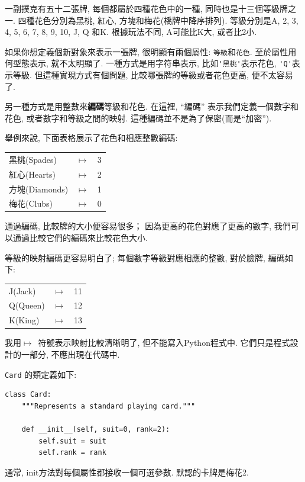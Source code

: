 \documentclass[10pt]{book}
\begin{document}
一副撲克有五十二張牌, 每個都屬於四種花色中的一種, 同時也是十三個等級牌之一. 
四種花色分別為黑桃, 紅心, 方塊和梅花(橋牌中降序排列). 
等級分別是A, 2, 3, 4, 5, 6, 7, 8, 9, 10, J, Q 和K. 根據玩法不同, 
A可能比K大, 或者比2小. 

如果你想定義個新對象來表示一張牌, 
很明顯有兩個屬性: {\tt 等級}和{\tt 花色}.
至於屬性用何型態表示, 就不太明顯了. 
一種方式是用字符串表示, 比如\verb"'黑桃'"表示花色, 
\verb"'Q'"表示等級. 
但這種實現方式有個問題, 比較哪張牌的等級或者花色更高, 便不太容易了. 

另一種方式是用整數來{\bf 編碼}等級和花色. 
在這裡, ``編碼'' 表示我們定義一個數字和花色, 或者數字和等級之間的映射. 
這種編碼並不是為了保密(而是``加密''). 

\newcommand{\mymapsto}{$\mapsto$}

舉例來說, 下面表格展示了花色和相應整數編碼:

\begin{tabular}{l c l}
黑桃(Spades) & \mymapsto & 3 \\
紅心(Hearts) & \mymapsto & 2 \\
方塊(Diamonds) & \mymapsto & 1 \\
梅花(Clubs) & \mymapsto & 0
\end{tabular}

通過編碼, 比較牌的大小便容易很多；
因為更高的花色對應了更高的數字, 我們可以通過比較它們的編碼來比較花色大小. 

等級的映射編碼更容易明白了; 
每個數字等級對應相應的整數, 對於臉牌, 編碼如下:

\begin{tabular}{l c l}
J(Jack) & \mymapsto & 11 \\
Q(Queen) & \mymapsto & 12 \\
K(King) & \mymapsto & 13 \\
\end{tabular}

我用\mymapsto~符號表示映射比較清晰明了, 但不能寫入Python程式中. 
它們只是程式設計的一部分, 不應出現在代碼中. 

{\tt Card} 的類定義如下:

\begin{verbatim}
class Card:
    """Represents a standard playing card."""

    def __init__(self, suit=0, rank=2):
        self.suit = suit
        self.rank = rank
\end{verbatim}
%
通常, init方法對每個屬性都接收一個可選參數. 
默認的卡牌是梅花2.
\end{document}
